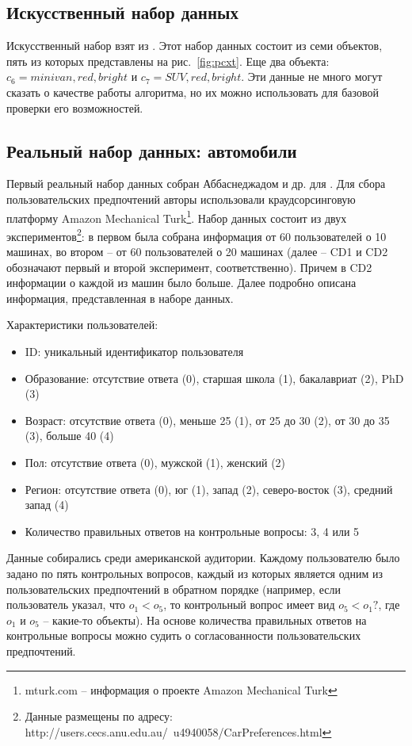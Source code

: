 	\subsection{Искусственный набор данных}
		Искусственный набор взят из \cite{Obiedkov:2013}. Этот набор данных состоит из семи объектов, пять из которых представлены на рис.~\ref{fig:pcxt}. Еще два объекта:
		$c_6={minivan, red, bright}$ и $c_7={SUV, red, bright}$. Эти данные не много могут сказать о качестве работы алгоритма, но их можно использовать для базовой проверки его возможностей.
	
	\subsection{Реальный набор данных: автомобили}
		Первый реальный набор данных собран Аббаснеджадом и др. для \cite{dataset:Abbasnejad:2013}. Для сбора пользовательских предпочтений авторы использовали краудсорсинговую платформу Amazon Mechanical Turk\footnote{mturk.com – информация о проекте Amazon Mechanical Turk}. Набор данных состоит из двух экспериментов\footnote{Данные размещены по адресу: http://users.cecs.anu.edu.au/~u4940058/CarPreferences.html}: в первом была собрана информация от 60 пользователей о 10 машинах, во втором – от 60 пользователей о 20 машинах (далее – CD1 и CD2 обозначают первый и второй эксперимент, соответственно). Причем в CD2 информации о каждой из машин было больше. Далее подробно описана информация, представленная в наборе данных.
		
		\vspace{1em}
		
		\noindent Характеристики пользователей:
		\vspace{-0.7em}
		\begin{itemize}[itemsep=-1.5mm]
			\item ID: уникальный идентификатор пользователя
			\item Образование: отсутствие ответа (0), старшая школа (1), бакалавриат (2), PhD (3)
			\item Возраст: отсутствие ответа (0), меньше 25 (1), от 25 до 30 (2), от 30 до 35 (3), больше 40 (4)
			\item Пол: отсутствие ответа (0), мужской (1), женский (2)
			\item Регион: отсутствие ответа (0), юг (1), запад (2), северо-восток (3), средний запад (4)
			\item Количество правильных ответов на контрольные вопросы: 3, 4 или 5
		\end{itemize}
		Данные собирались среди американской аудитории. Каждому пользователю было задано по пять контрольных вопросов, каждый из которых является одним из пользовательских предпочтений в обратном порядке (например, если пользователь указал, что $o_1 < o_5$, то контрольный вопрос имеет вид $o_5 < o_1?$, где $o_1$ и $o_5$ – какие-то объекты). На основе количества правильных ответов на контрольные вопросы можно судить о согласованности пользовательских предпочтений.
		
